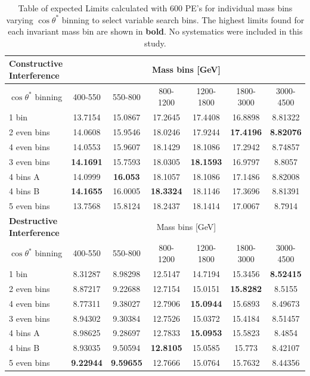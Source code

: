     \begin {table}[h!]
        \begin{center}
        \begin{tabular}{ |l|c|c|c|c|c|c| } 
            \hline
            \hline
            {\bf Constructive Interference} & \multicolumn{6}{c|}{Mass bins [GeV]} \\ 
            \hline
            $\cos{\theta^{*}}$ binning & 400-550 & 550-800 & 800-1200 & 1200-1800 & 1800-3000 & 3000-4500 \\
            \hline
            1 bin       & 13.7154 & 15.0867 & 17.2645 & 17.4408 & 16.8898 & 8.81322 \\
            2 even bins & 14.0608 & 15.9546 & 18.0246 & 17.9244 & {\bf17.4196} & {\bf8.82076} \\
            4 even bins & 14.0553 & 15.9607 & 18.1429 & 18.1086 & 17.2942 & 8.74857 \\
            3 even bins & {\bf14.1691} & 15.7593 & 18.0305 & {\bf18.1593} & 16.9797 & 8.8057 \\
            4 bins A    & 14.0999 & {\bf16.053}  & 18.1057 & 18.1086 & 17.1486 & 8.82008 \\
            4 bins B    & {\bf14.1655} & 16.0005 & {\bf18.3324} & 18.1146 & 17.3696 & 8.81391 \\
            5 even bins & 13.7568 & 15.8124 & 18.2437 & 18.1414 & 17.0067 & 8.7914 \\
            \hline
            \hline
            {\bf Destructive Interference} & \multicolumn{6}{c|}{Mass bins [GeV]} \\
            \hline
            $\cos{\theta^{*}}$ binning & 400-550 & 550-800 & 800-1200 & 1200-1800 & 1800-3000 & 3000-4500 \\
            \hline
            1 bin       & 8.31287 & 8.98298 & 12.5147 & 14.7194 & 15.3456 & {\bf8.52415} \\
            2 even bins & 8.87217 & 9.22688 & 12.7154 & 15.0151 & {\bf15.8282} & 8.5155 \\
            4 even bins & 8.77311 & 9.38027 & 12.7906 & {\bf15.0944} & 15.6893 & 8.49673 \\
            3 even bins & 8.94302 & 9.30384 & 12.7526 & 15.0372 & 15.4184 & 8.51457 \\
            4 bins A    & 8.98625 & 9.28697 & 12.7833 & {\bf15.0953} & 15.5823 & 8.4854 \\
            4 bins B    & 8.93035 & 9.50594 & {\bf12.8105} & 15.0585 & 15.773 & 8.42107 \\
            5 even bins & {\bf9.22944} & {\bf9.59655} & 12.7666 & 15.0764 & 15.7632 & 8.44356 \\
            \hline
            \hline
        \end{tabular}
        \caption{Table of expected Limits calculated with 600 PE's for individual mass bins varying $\cos{\theta^{*}}$ binning to select variable search bins. The highest limits found for each invariant mass bin are shown in {\bf bold}. No systematics were included in this study.}
        \label{tab:limits_binOpp}
        \end{center}
    \end {table}


